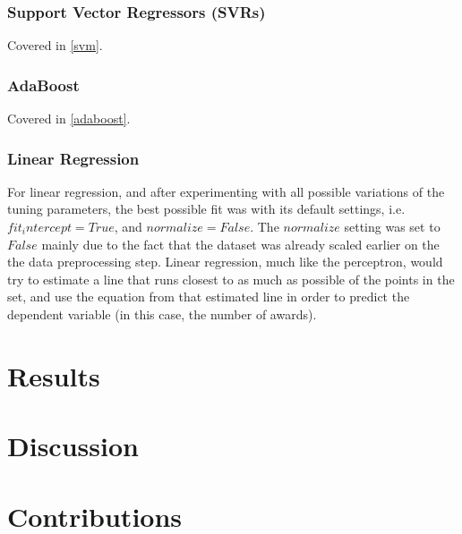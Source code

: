 \documentclass[journal,transmag]{IEEEtran}
\begin{document}
			\subsubsection{Support Vector Regressors (SVRs)}
			Covered in \ref{svm}.
			
			\subsubsection{AdaBoost}
			Covered in \ref{adaboost}.			
			
			\subsubsection{Linear Regression}
			For linear regression, and after experimenting with all possible variations of the tuning parameters, the best possible fit was with its default settings, i.e. $fit_intercept=True$, and $normalize=False$. The $normalize$ setting was set to $False$ mainly due to the fact that the dataset was already scaled earlier on the the data preprocessing step. Linear regression, much like the perceptron, would try to estimate a line that runs closest to as much as possible of the points in the set, and use the equation from that estimated line in order to predict the dependent variable (in this case, the number of awards).
	
	\section{Results}
	
	
	\section{Discussion}
	
	
	\section{Contributions}
	
\end{document}
